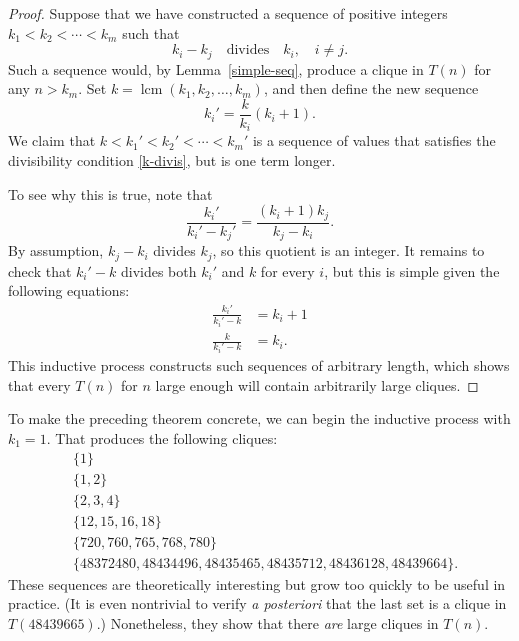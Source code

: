 \documentclass[]{article}
\theoremstyle{definition}
\begin{document}
\begin{proof}
    Suppose that we have constructed a sequence of positive integers $k_1 < k_2
    < \cdots < k_m$ such that
    \begin{equation}
        \label{k-divis}
        k_i - k_j \quad \text{divides} \quad k_i,\quad i \neq j.
    \end{equation}
    Such a sequence would, by Lemma~\ref{simple-seq}, produce a clique in
    $T(n)$ for any $n > k_m$. Set $k = \operatorname{lcm}(k_1, k_2, \dots,
    k_m)$, and then define the new sequence
    \begin{equation*}
        k_i' = \frac{k}{k_i} (k_i + 1).
    \end{equation*}
    We claim that $k < k_1' < k_2' < \cdots < k_m'$ is a sequence of values
    that satisfies the divisibility condition \eqref{k-divis}, but is one term
    longer.

    To see why this is true, note that
    \begin{equation*}
        \frac{k_i'}{k_i' - k_j'} = \frac{(k_i + 1) k_j}{k_j - k_i}.
    \end{equation*}
    By assumption, $k_j - k_i$ divides $k_j$, so this quotient is an integer.
    It remains to check that $k_i' - k$ divides both $k_i'$ and $k$ for every
    $i$, but this is simple given the following equations:
    \begin{align*}
        \frac{k_i'}{k_i' - k} &= k_i + 1 \\
        \frac{k}{k_i' - k} &= k_i.
    \end{align*}
    This inductive process constructs such sequences of arbitrary length, which
    shows that every $T(n)$ for $n$ large enough will contain arbitrarily large
    cliques.
\end{proof}

To make the preceding theorem concrete, we can begin the inductive process with
$k_1 = 1$. That produces the following cliques:
\begin{align*}
    &\{1\} \\
    &\{1, 2\} \\
    &\{2, 3, 4\} \\
    &\{12, 15, 16, 18\} \\
    &\{720, 760, 765, 768, 780\} \\
    &\{48372480, 48434496, 48435465, 48435712, 48436128, 48439664\}.
\end{align*}
These sequences are theoretically interesting but grow too quickly to be useful
in practice. (It is even nontrivial to verify \emph{a posteriori} that the last
set is a clique in $T(48439665)$.) Nonetheless, they show that there \emph{are}
large cliques in $T(n)$.
\end{document}
